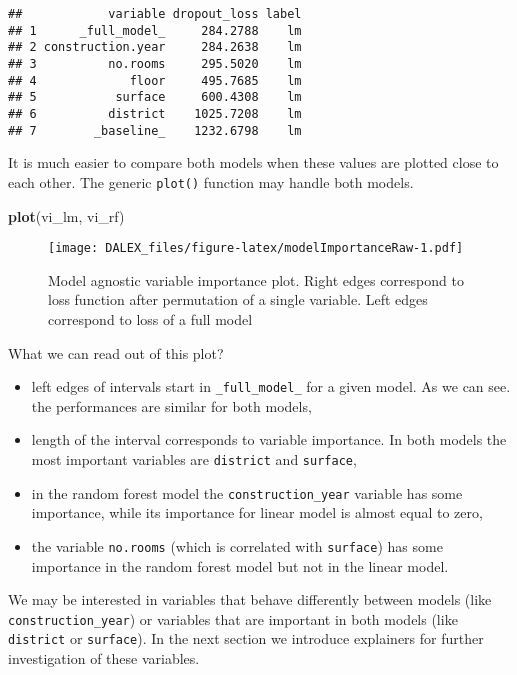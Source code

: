 \documentclass[]{book}
\newenvironment{Shaded}{\begin{snugshade}}{\end{snugshade}}
\newcommand{\KeywordTok}[1]{\textcolor[rgb]{0.13,0.29,0.53}{\textbf{#1}}}
\newcommand{\NormalTok}[1]{#1}
\providecommand{\tightlist}{%
  \setlength{\itemsep}{0pt}\setlength{\parskip}{0pt}}
\theoremstyle{definition}
\theoremstyle{definition}
\theoremstyle{definition}
\theoremstyle{remark}
\begin{document}
\begin{verbatim}
##            variable dropout_loss label
## 1      _full_model_     284.2788    lm
## 2 construction.year     284.2638    lm
## 3          no.rooms     295.5020    lm
## 4             floor     495.7685    lm
## 5           surface     600.4308    lm
## 6          district    1025.7208    lm
## 7        _baseline_    1232.6798    lm
\end{verbatim}

It is much easier to compare both models when these values are plotted
close to each other. The generic \texttt{plot()} function may handle
both models.

\begin{Shaded}
\begin{Highlighting}[]
\KeywordTok{plot}\NormalTok{(vi_lm, vi_rf)}
\end{Highlighting}
\end{Shaded}

\begin{figure}
\centering
\texttt{[image: DALEX\_files/figure-latex/modelImportanceRaw-1.pdf]}
\caption{\label{fig:modelImportanceRaw}Model agnostic variable importance
plot. Right edges correspond to loss function after permutation of a
single variable. Left edges correspond to loss of a full model}
\end{figure}

What we can read out of this plot?

\begin{itemize}
\tightlist
\item
  left edges of intervals start in \texttt{\_full\_model\_} for a given
  model. As we can see. the performances are similar for both models,
\item
  length of the interval corresponds to variable importance. In both
  models the most important variables are \texttt{district} and
  \texttt{surface},
\item
  in the random forest model the \texttt{construction\_year} variable
  has some importance, while its importance for linear model is almost
  equal to zero,
\item
  the variable \texttt{no.rooms} (which is correlated with
  \texttt{surface}) has some importance in the random forest model but
  not in the linear model.
\end{itemize}

We may be interested in variables that behave differently between models
(like \texttt{construction\_year}) or variables that are important in
both models (like \texttt{district} or \texttt{surface}). In the next
section we introduce explainers for further investigation of these
variables.
\end{document}
